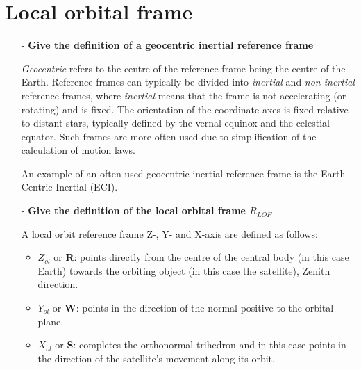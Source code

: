 \section{Local orbital frame}
\label{sec:local}

\begin{itemize}
    \item[-] \textbf{Give the definition of a geocentric inertial reference frame}

    \textit{Geocentric} refers to the centre of the reference frame being the centre of the Earth. 
    Reference frames can typically be divided into \textit{inertial} and \textit{non-inertial} reference frames, where \textit{inertial} means that the frame is not accelerating (or rotating) and is fixed. 
    The orientation of the coordinate axes is fixed relative to distant stars, typically defined by the vernal equinox and the celestial equator.
    Such frames are more often used due to simplification of the calculation of motion laws.
    
    An example of an often-used geocentric inertial reference frame is the Earth-Centric Inertial (ECI).
    
    \item[-] \textbf{Give the definition of the local orbital frame $R_{LOF}$}
    
    A local orbit reference frame Z-, Y- and X-axis are defined as follows:
    \begin{itemize}
        \item $Z_{ol}$ or \textbf{R}: points directly from the centre of the central body (in this case Earth) towards the orbiting object (in this case the satellite), Zenith direction.
        
        \item $Y_{ol}$ or \textbf{W}: points in the direction of the normal positive to the orbital plane.
    
        \item $X_{ol}$ or \textbf{S}: completes the orthonormal trihedron and in this case points in the direction of the satellite's movement along its orbit.
    \end{itemize} 
    

\end{itemize}
